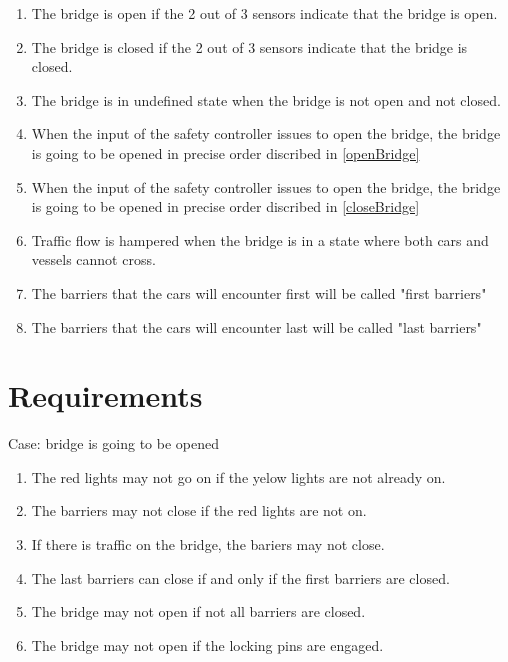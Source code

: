 \documentclass[a4paper]{article}
\begin{document}
\begin{enumerate}
\item{The bridge is open if the 2 out of 3 sensors indicate that the bridge is open.}
\item{The bridge is closed if the 2 out of 3 sensors indicate that the bridge is closed.}
\item{The bridge is in undefined state when the bridge is not open and not closed.}
\item{When the input of the safety controller issues to open the bridge, the bridge is going to be opened in precise order discribed in \ref{openBridge}}
\item{When the input of the safety controller issues to open the bridge, the bridge is going to be opened in precise order discribed in \ref{closeBridge}}
\item{Traffic flow is hampered when the bridge is in a state where both cars and vessels cannot cross.}
\item{The barriers that the cars will encounter first will be called "first barriers"}
\item{The barriers that the cars will encounter last will be called "last barriers"}

\end{enumerate}




\section{Requirements}
\label{sec:requirements}

Case: bridge is going to be opened
\label{openBridge}
\begin{enumerate}

\item{The red lights may not go on if the yelow lights are not already on.}
\item{The barriers may not close if the red lights are not on.}
\item{\label{item:traffic}If there is traffic on the bridge, the bariers may not close.}
\item{The last barriers can close if and only if the first barriers are closed.}
\item{The bridge may not open if not all barriers are closed.}
\item{The bridge may not open if the locking pins are engaged.}

\end{enumerate}
\end{document}
